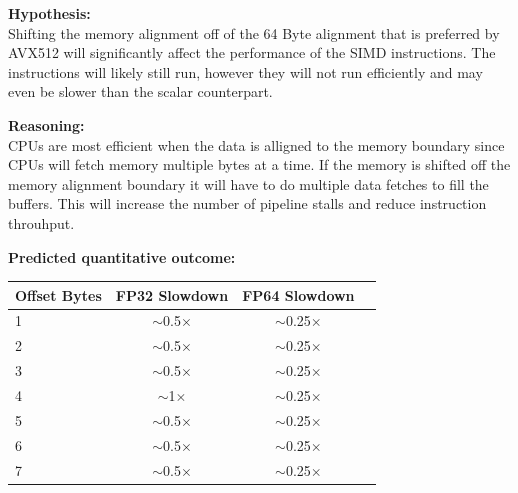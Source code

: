\documentclass[11pt]{article}
\begin{document}
\begin{hypothesisbox}
	\textbf{Hypothesis:} \\

	Shifting the memory alignment off of the 64 Byte alignment that is preferred by AVX512 will significantly affect the
	performance of the SIMD instructions. The instructions will likely still run, however they will not run efficiently and
	may even be slower than the scalar counterpart.

	\textbf{Reasoning:} \\

	CPUs are most efficient when the data is alligned to the memory boundary since CPUs will fetch memory multiple bytes at
	a time. If the memory is shifted off the memory alignment boundary it will have to do multiple data fetches to fill the
	buffers. This will increase the number of pipeline stalls and reduce instruction throuhput.

	\textbf{Predicted quantitative outcome:} \\
	\begin{center}
		\label{tab:hypothesis-simd}
		\begin{tabular}{lccc}
			\toprule
			\textbf{Offset Bytes} & \textbf{FP32 Slowdown} & \textbf{FP64 Slowdown} \\
			\midrule
			1                     & $\sim$0.5$\times$      & $\sim$0.25$\times$     \\
			2                     & $\sim$0.5$\times$      & $\sim$0.25$\times$     \\
			3                     & $\sim$0.5$\times$      & $\sim$0.25$\times$     \\
			4                     & $\sim$1$\times$        & $\sim$0.25$\times$     \\
			5                     & $\sim$0.5$\times$      & $\sim$0.25$\times$     \\
			6                     & $\sim$0.5$\times$      & $\sim$0.25$\times$     \\
			7                     & $\sim$0.5$\times$      & $\sim$0.25$\times$     \\
			\bottomrule
		\end{tabular}
	\end{center}
\end{hypothesisbox}
\end{document}
